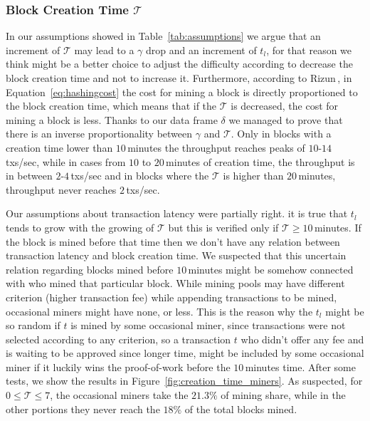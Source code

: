 \documentclass[USenglish]{uit-thesis}
\begin{document}
\subsubsection{Block Creation Time $\mathcal{T}$}
In our assumptions showed in Table~\ref{tab:assumptions} we argue
that an increment of $\mathcal{T}$ may lead to a
$\gamma$ drop and an increment of $t_l$, for that reason we think
might be a better choice to adjust the difficulty according to
decrease the block creation time and not to increase it. Furthermore,
according to Rizun\,\cite{Rizun:2015:blocksizelimit}, in Equation~\ref{eq:hashingcost}
the cost for mining a block is directly proportioned to the block creation
time, which means that if the $\mathcal{T}$ is decreased, the cost for
mining a block is less. Thanks to our data frame $\delta$ we managed to
prove that there is an inverse proportionality between $\gamma$ and
$\mathcal{T}$. Only in blocks with a creation time lower than $10$\,minutes
the throughput reaches peaks of $10$-$14$\,txs/sec, while in
cases from $10$ to $20$\,minutes of creation
time, the throughput is in between
$2$-$4$\,txs/sec and in blocks where the $\mathcal{T}$ is
higher than $20$\,minutes, throughput never reaches
$2$\,txs/sec.

Our assumptions about transaction latency were partially right.
it is true that $t_l$ tends to grow with the growing
of $\mathcal{T}$ but this is verified
only if $\mathcal{T} \geq 10$\,minutes. If the block is mined
before that time then we don't have any relation between
transaction latency and block creation time.
We suspected that this uncertain relation regarding
blocks mined before $10$\,minutes might be
somehow connected with who mined that particular block.
While mining pools may have different criterion (higher transaction
fee) while appending transactions to be mined,
occasional miners might have none, or less. This is the reason why
the $t_l$ might be so random if $t$ is mined by some occasional miner,
since transactions were not selected
according to any criterion, so a transaction $t$ who didn't offer any fee
and is waiting to be approved since longer time, might be included
by some occasional miner if it luckily wins the proof-of-work before
the $10$\,minutes time. After some tests, we show the results in
Figure~\ref{fig:creation_time_miners}. As suspected, for $0 \leq \mathcal{T} \leq 7$,
the occasional miners take the $21.3\%$ of mining share, while in the
other portions they never reach the $18\%$ of the total blocks mined.
\end{document}
